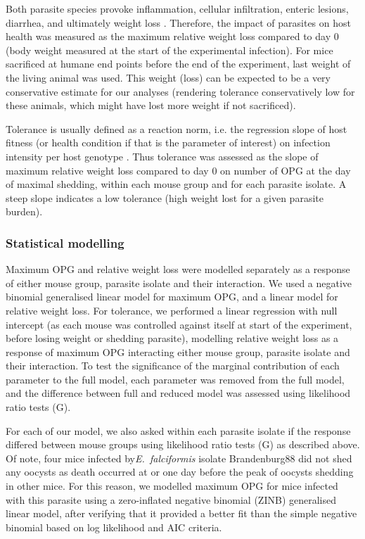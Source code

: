 \documentclass[12pt]{article}
\begin{document}
Both parasite species provoke inflammation, cellular infiltration, enteric lesions, diarrhea, and ultimately weight loss \citep{ankrom_life_1975, ehret_dual_2017, schito_comparison_1996, al-khlifeh_eimeria_2019}. Therefore, the impact of parasites on host health was measured as the maximum relative weight loss compared to day 0 (body weight measured at the start of the experimental infection). For mice sacrificed at humane end points before the end of the experiment, last weight of the living animal was used. This weight (loss) can be expected to be a very conservative estimate for our analyses (rendering tolerance conservatively low for these animals, which might have lost more weight if not sacrificed). \par

Tolerance is usually defined as a reaction norm, i.e. the regression slope of host fitness (or health condition if that is the parameter of interest) on infection intensity per host genotype \citep{Simms2000, raaberg_decomposing_2009}. Thus tolerance was assessed as the slope of maximum relative weight loss compared to day 0 on number of OPG at the day of maximal shedding, within each mouse group and for each parasite isolate. A steep slope indicates a low tolerance (high weight lost for a given parasite burden).

\subsubsection{Statistical modelling}

Maximum OPG and relative weight loss were modelled separately as a response of either mouse group, parasite isolate and their interaction. We used a negative binomial generalised linear model for maximum OPG, and a linear model for relative weight loss. For tolerance, we performed a linear regression with null intercept (as each mouse was controlled against itself at start of the experiment, before losing weight or shedding parasite), modelling relative weight loss as a response of maximum OPG interacting either mouse group, parasite isolate and their interaction. To test the significance of the marginal contribution of each parameter to the full model, each parameter was removed from the full model, and the difference between full and reduced model was assessed using likelihood ratio tests (G). \par

For each of our model, we also asked within each parasite isolate if the response differed between mouse groups using likelihood ratio tests (G) as described above. Of note, four mice infected by\textit{E.~falciformis} isolate Brandenburg88 did not shed any oocysts as death occurred at or one day before the peak of oocysts shedding in other mice. For this reason, we modelled maximum OPG for mice infected with this parasite using a zero-inflated negative binomial (ZINB) generalised linear model, after verifying that it provided a better fit than the simple negative binomial based on log likelihood and AIC criteria.\par
\end{document}

